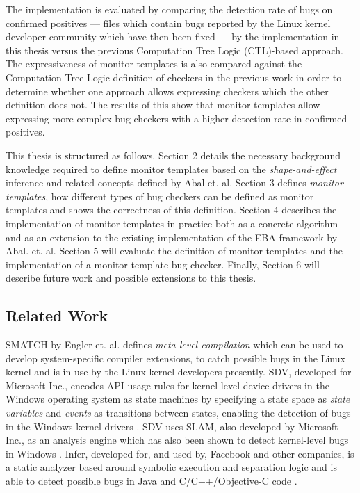 \newpar The implementation is evaluated by comparing the detection rate of bugs on confirmed positives --- files which contain bugs reported by the Linux kernel developer community which have then been fixed --- by the implementation in this thesis versus the previous Computation Tree Logic (CTL)-based approach. The expressiveness of monitor templates is also compared against the Computation Tree Logic definition of checkers in the previous work in order to determine whether one approach allows expressing checkers which the other definition does not. The results of this show that monitor templates allow expressing more complex bug checkers with a higher detection rate in confirmed positives.   

\newpar This thesis is structured as follows. Section 2 details the necessary background knowledge required to define monitor templates based on the \textit{shape-and-effect} inference and related concepts defined by Abal et. al. Section 3 defines \textit{monitor templates}, how different types of bug checkers can be defined as monitor templates and shows the correctness of this definition. Section 4 describes the implementation of monitor templates in practice both as a concrete algorithm and as an extension to the existing implementation of the EBA framework by Abal. et. al. Section 5 will evaluate the definition of monitor templates and the implementation of a monitor template bug checker. Finally, Section 6 will describe future work and possible extensions to this thesis.    

\subsection{Related Work}
SMATCH by Engler et. al. \cite{smatch} defines \textit{meta-level compilation} which can be used to develop system-specific compiler extensions, to catch possible bugs in the Linux kernel and is in use by the Linux kernel developers presently. SDV, developed for Microsoft Inc., encodes API usage rules for kernel-level device drivers in the Windows operating system as state machines by specifying a state space as \textit{state variables} and \textit{events} as transitions between states, enabling the detection of bugs in the Windows kernel drivers \cite{SDV}. SDV uses SLAM, also developed by Microsoft Inc., as an analysis engine which has also been shown to detect kernel-level bugs in Windows \cite{SLAM}. Infer, developed for, and used by, Facebook and other companies, is a static analyzer based around symbolic execution and separation logic and is able to detect possible bugs in Java and C/C++/Objective-C code \cite{infer}.